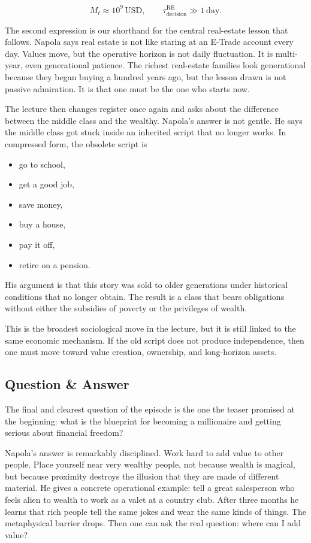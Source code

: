 \begin{equation}
M_t \approx 10^9\,\mathrm{USD}, \qquad \tau_{\text{decision}}^{\text{RE}} \gg 1\ \text{day}.
\end{equation}

The second expression is our shorthand for the central real-estate lesson that follows. Napola says real estate is not like staring at an E-Trade account every day. Values move, but the operative horizon is not daily fluctuation. It is multi-year, even generational patience. The richest real-estate families look generational because they began buying a hundred years ago, but the lesson drawn is not passive admiration. It is that one must be the one who starts now.

The lecture then changes register once again and asks about the difference between the middle class and the wealthy. Napola's answer is not gentle. He says the middle class got stuck inside an inherited script that no longer works. In compressed form, the obsolete script is
\begin{itemize}
\item go to school,
\item get a good job,
\item save money,
\item buy a house,
\item pay it off,
\item retire on a pension.
\end{itemize}
His argument is that this story was sold to older generations under historical conditions that no longer obtain. The result is a class that bears obligations without either the subsidies of poverty or the privileges of wealth.

This is the broadest sociological move in the lecture, but it is still linked to the same economic mechanism. If the old script does not produce independence, then one must move toward value creation, ownership, and long-horizon assets.

\subsection{Question \& Answer}

The final and clearest question of the episode is the one the teaser promised at the beginning: what is the blueprint for becoming a millionaire and getting serious about financial freedom?

Napola's answer is remarkably disciplined. Work hard to add value to other people. Place yourself near very wealthy people, not because wealth is magical, but because proximity destroys the illusion that they are made of different material. He gives a concrete operational example: tell a great salesperson who feels alien to wealth to work as a valet at a country club. After three months he learns that rich people tell the same jokes and wear the same kinds of things. The metaphysical barrier drops. Then one can ask the real question: where can I add value?

